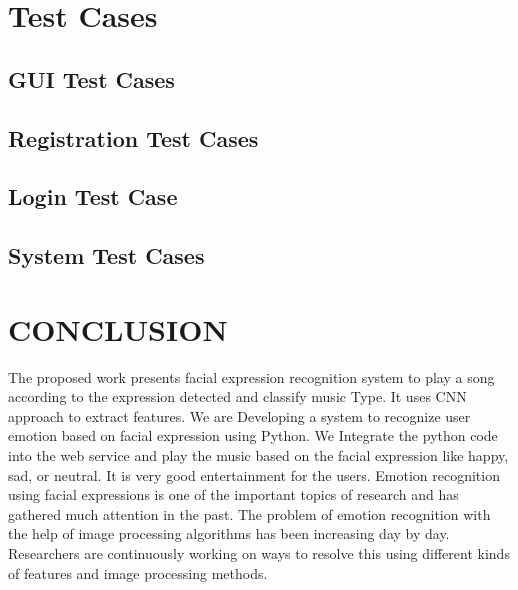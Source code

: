\documentclass[12pt]{report}
\begin{document}
\clearpage


\centering
\section{Test Cases}
\justifying
\setlength{\parindent}{4em}
\setlength{\parskip}{0.5em}
\renewcommand{\baselinestretch}{1.5}
\normalsize
\subsection{GUI Test Cases}


\vspace{1cm}
\clearpage

\subsection{Registration Test Cases}


\vspace{1cm}
\clearpage

\subsection{Login Test Case}


\vspace{1cm}
\clearpage

\subsection{System Test Cases}

\vspace{1cm}
\clearpage


\centering
\section{CONCLUSION }
\justifying
\setlength{\parindent}{4em}
\setlength{\parskip}{0.5em}
\renewcommand{\baselinestretch}{1.5}
\normalsize

\hspace{1.7cm}The proposed work presents facial expression recognition system to play a song according 
to the expression detected and classify music Type. It uses CNN approach to extract features. We 
are Developing a system to recognize user emotion based on facial expression using Python. We 
Integrate the python code into the web service and play the music based on the facial expression 
like happy, sad, or neutral. It is very good entertainment for the users. Emotion recognition using 
facial expressions is one of the important topics of research and has gathered much attention in the 
past. The problem of emotion recognition with the help of image processing algorithms has been 
increasing day by day. Researchers are continuously working on ways to resolve this using different 
kinds of features and image processing methods.\\
\vspace{15cm}
\end{document}
